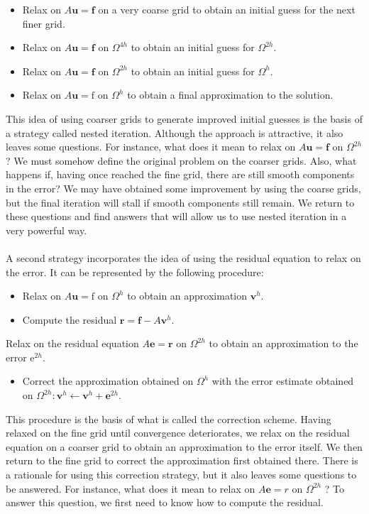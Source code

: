 \documentclass[11pt]{book}
\begin{document}
\begin{itemize}
  \item Relax on $A \mathbf{u}=\mathbf{f}$ on a very coarse grid to obtain an initial guess for the next finer grid.

  \item Relax on $A \mathbf{u}=\mathbf{f}$ on $\Omega^{4 h}$ to obtain an initial guess for $\Omega^{2 h}$.

  \item Relax on $A \mathbf{u}=\mathbf{f}$ on $\Omega^{2 h}$ to obtain an initial guess for $\Omega^{h}$.

  \item Relax on $A \mathbf{u}=\mathrm{f}$ on $\Omega^{h}$ to obtain a final approximation to the solution.

\end{itemize}
This idea of using coarser grids to generate improved initial guesses is the basis of a strategy called nested iteration. Although the approach is attractive, it also leaves some questions. For instance, what does it mean to relax on $A \mathbf{u}=\mathbf{f}$ on $\Omega^{2 h}$ ? We must somehow define the original problem on the coarser grids. Also, what happens if, having once reached the fine grid, there are still smooth components in the error? We may have obtained some improvement by using the coarse grids, but the final iteration will stall if smooth components still remain. We return to these questions and find answers that will allow us to use nested iteration in a very powerful way. \\ \\
A second strategy incorporates the idea of using the residual equation to relax on the error. It can be represented by the following procedure:
\begin{itemize}
  \item Relax on $A \mathbf{u}=\mathrm{f}$ on $\Omega^{h}$ to obtain an approximation $\mathbf{v}^{h}$.

  \item Compute the residual $\mathbf{r}=\mathbf{f}-A \mathbf{v}^{h}$.

\end{itemize}
Relax on the residual equation $A \mathbf{e}=\mathbf{r}$ on $\Omega^{2 h}$ to obtain an approximation to the error $\mathrm{e}^{2 h}$.

\begin{itemize}
  \item Correct the approximation obtained on $\Omega^{h}$ with the error estimate obtained on $\Omega^{2 h}: \mathbf{v}^{h} \leftarrow \mathbf{v}^{h}+\mathbf{e}^{2 h}$.
\end{itemize}
This procedure is the basis of what is called the correction scheme. Having relaxed on the fine grid until convergence deteriorates, we relax on the residual equation on a coarser grid to obtain an approximation to the error itself. We then return to the fine grid to correct the approximation first obtained there.
There is a rationale for using this correction strategy, but it also leaves some questions to be answered. For instance, what does it mean to relax on $A \mathbf{e}=r$ on $\Omega^{2 h}$ ? To answer this question, we first need to know how to compute the residual.
\end{document}
